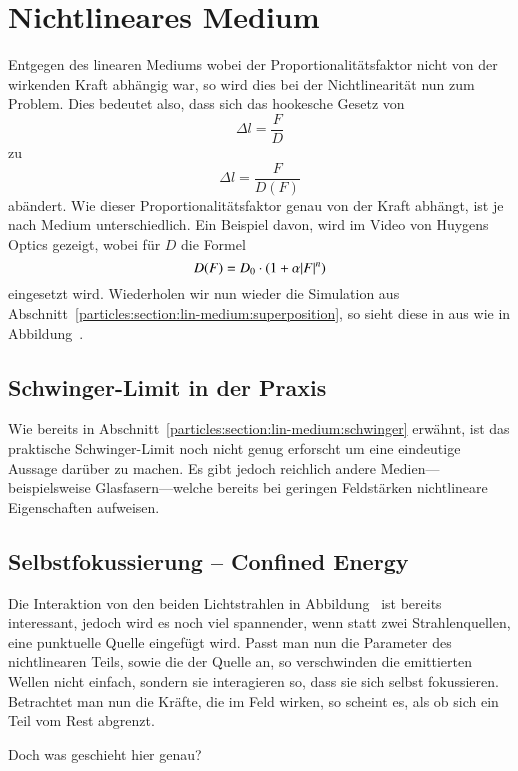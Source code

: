 %
%
%
%
\section{Nichtlineares Medium
\label{particles:section:nichtlinear}}
Entgegen des linearen Mediums wobei der Proportionalitätsfaktor nicht von der wirkenden Kraft abhängig war, 
so wird dies bei der Nichtlinearität nun zum Problem.
Dies bedeutet also, dass sich das hookesche Gesetz von 
\[
    \Delta l
    = 
    \frac{F}{D}
\]
zu
\[
    \Delta l
    = 
    \frac{F}{D(F)}
\]
abändert. 
Wie dieser Proportionalitätsfaktor genau von der Kraft abhängt, 
ist je nach Medium unterschiedlich.
Ein Beispiel davon, wird im Video  von Huygens Optics gezeigt,
wobei für $D$ die Formel 
\[
    D(F)
    =
    D_0
    \cdot
    (1 + \alpha \abs{F}^n)
\]
eingesetzt wird.
Wiederholen wir nun wieder die Simulation aus Abschnitt~\ref{particles:section:lin-medium:superposition}, 
so sieht diese in aus wie in Abbildung~.


\subsection{Schwinger-Limit in der Praxis}
Wie bereits in Abschnitt~\ref{particles:section:lin-medium:schwinger} erwähnt, 
ist das praktische Schwinger-Limit noch nicht genug erforscht um eine eindeutige Aussage darüber zu machen.
Es gibt jedoch reichlich andere Medien---beispielsweise Glasfasern---welche bereits bei geringen Feldstärken nichtlineare Eigenschaften aufweisen.


\subsection{Selbstfokussierung -- Confined Energy}
Die Interaktion von den beiden Lichtstrahlen in Abbildung~
ist bereits interessant, jedoch wird es noch viel spannender, 
wenn statt zwei Strahlenquellen, eine punktuelle Quelle eingefügt wird.
Passt man nun die Parameter des nichtlinearen Teils, sowie die der Quelle an, 
so verschwinden die emittierten Wellen nicht einfach, 
sondern sie interagieren so, dass sie sich selbst fokussieren.
Betrachtet man nun die Kräfte, die im Feld wirken, 
so scheint es, als ob sich ein Teil vom Rest abgrenzt.

Doch was geschieht hier genau? 

